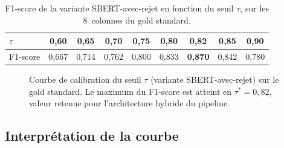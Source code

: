\begin{table}[h]
\centering
\caption{F1-score de la variante SBERT-avec-rejet en fonction du seuil
         $\tau$, sur les 8~colonnes du gold standard.}
\label{tab:calibration_tau}
\begin{tabular}{lcccccccc}
\hline
$\tau$ & 0,60 & 0,65 & 0,70 & 0,75 & 0,80 & \textbf{0,82} & 0,85 & 0,90 \\
\hline
F1-score & 0,667 & 0,714 & 0,762 & 0,800 & 0,833 & \textbf{0,870} & 0,842 & 0,780 \\
\hline
\end{tabular}
\end{table}

\begin{figure}[H]
\centering
{}
\caption{Courbe de calibration du seuil $\tau$ (variante
         SBERT-avec-rejet) sur le gold standard. Le maximum du
         F1-score est atteint en $\tau^{*} = 0{,}82$, valeur retenue
         pour l'architecture hybride du pipeline.}
\label{fig:calibration_tau}
\end{figure}

\subsection{Interprétation de la courbe}

